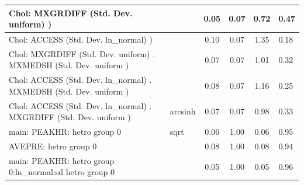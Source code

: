 \begin{table}
\begin{center}
\begin{tabular}{|l|l|c|c|c|l|}
			\hline
			 Chol: MXGRDIFF (Std. Dev. uniform) ) &  & 0.05 & 0.07 & 0.72 & 0.47 \\
			\hline
			 Chol: ACCESS (Std. Dev. ln_normal) ) &  & 0.10 & 0.07 & 1.35 & 0.18 \\
			\hline
			 Chol: MXGRDIFF (Std. Dev. uniform) . MXMEDSH (Std. Dev.   uniform ) &  & 0.07 & 0.07 & 1.01 & 0.32 \\
			\hline
			 Chol: ACCESS (Std. Dev. ln_normal) . MXMEDSH (Std. Dev.   uniform ) &  & 0.08 & 0.07 & 1.16 & 0.25 \\
			\hline
			 Chol: ACCESS (Std. Dev. ln_normal) . MXGRDIFF (Std. Dev.   uniform ) & arcsinh & 0.07 & 0.07 & 0.98 & 0.33 \\
			\hline
			main: PEAKHR: hetro group 0 & sqrt & 0.06 & 1.00 & 0.06 & 0.95 \\
			\hline
			AVEPRE: hetro group 0 &  & 0.08 & 1.00 & 0.08 & 0.94 \\
			\hline
			main: PEAKHR: hetro group 0:ln_normal:sd  hetro group 0 &  & 0.05 & 1.00 & 0.05 & 0.96 \\
			\hline
		\end{tabular}
	\end{center}
\end{table}